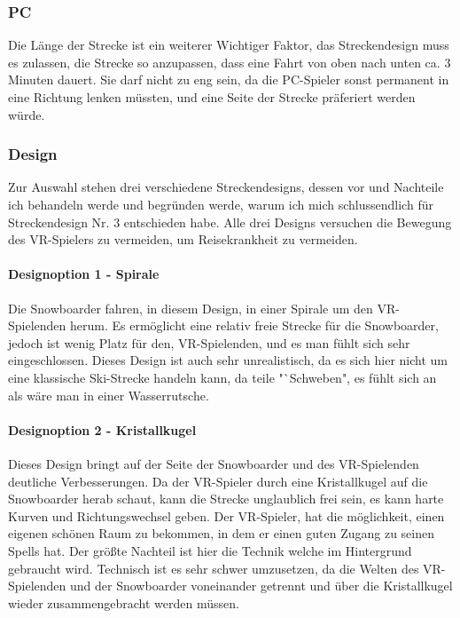 \subsubsection{PC}

Die Länge der Strecke ist ein weiterer Wichtiger Faktor, das Streckendesign muss es zulassen, die Strecke so anzupassen, dass eine Fahrt von oben nach unten ca. 3 Minuten dauert. Sie darf nicht zu eng sein, da die PC-Spieler sonst permanent in eine Richtung lenken müssten, und eine Seite der Strecke präferiert werden würde.

\subsubsection{Design}

Zur Auswahl stehen drei verschiedene Streckendesigns, dessen vor und Nachteile ich behandeln werde und begründen werde, warum ich mich schlussendlich für Streckendesign Nr. 3 entschieden habe. Alle drei Designs versuchen die Bewegung des VR-Spielers zu vermeiden, um Reisekrankheit zu vermeiden.

\paragraph{Designoption 1 - Spirale}

Die Snowboarder fahren, in diesem Design, in einer Spirale um den VR-Spielenden herum. Es ermöglicht eine relativ freie Strecke für die Snowboarder, jedoch ist wenig Platz für den, VR-Spielenden, und es man fühlt sich sehr eingeschlossen. Dieses Design ist auch sehr unrealistisch, da es sich hier nicht um eine klassische Ski-Strecke handeln kann, da teile "`Schweben", es fühlt sich an als wäre man in einer Wasserrutsche.

\paragraph{Designoption 2 - Kristallkugel}

Dieses Design bringt auf der Seite der Snowboarder und des VR-Spielenden deutliche Verbesserungen. Da der VR-Spieler durch eine Kristallkugel auf die Snowboarder herab schaut, kann die Strecke unglaublich frei sein, es kann harte Kurven und Richtungswechsel geben. Der VR-Spieler, hat die möglichkeit, einen eigenen schönen Raum zu bekommen, in dem er einen guten Zugang zu seinen Spells hat. Der größte Nachteil ist hier die Technik welche im Hintergrund gebraucht wird. Technisch ist es sehr schwer umzusetzen, da die Welten des VR-Spielenden und der Snowboarder voneinander getrennt und über die Kristallkugel wieder zusammengebracht werden müssen.

